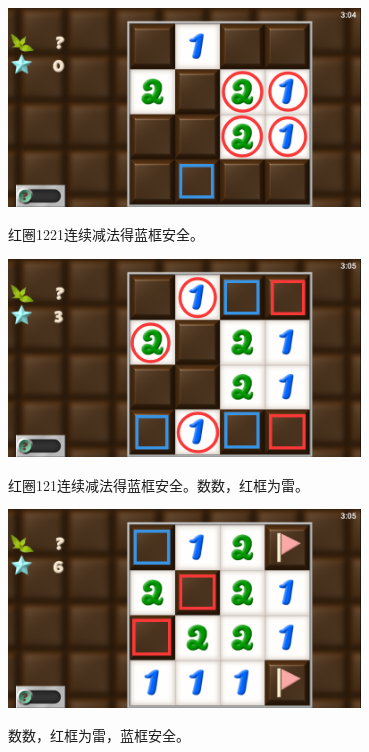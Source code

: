 \subsection{} %
\begin{center}
    \includegraphics[width=0.7\textwidth]{puzzle/51-1.png}
\end{center}
红圈1221连续减法得蓝框安全。
\begin{center}
    \includegraphics[width=0.7\textwidth]{puzzle/51-2.png}
\end{center}
红圈121连续减法得蓝框安全。数数，红框为雷。
\begin{center}
    \includegraphics[width=0.7\textwidth]{puzzle/51-3.png}
\end{center}
数数，红框为雷，蓝框安全。

